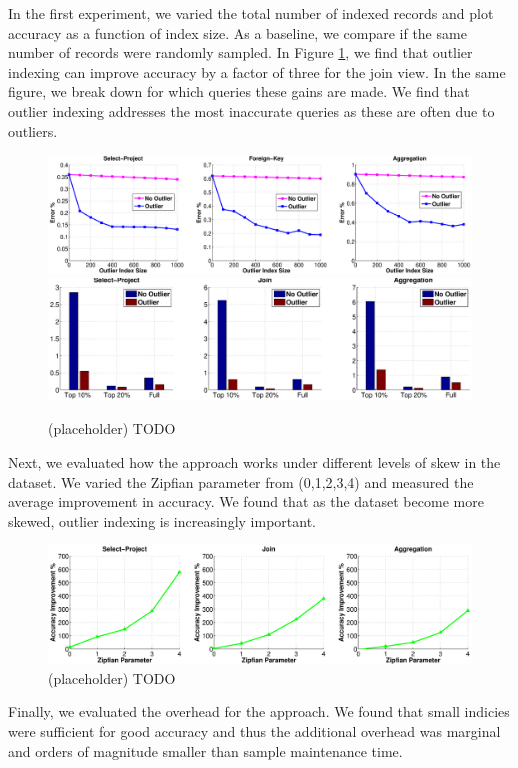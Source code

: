 In the first experiment, we varied the total number of indexed records and plot accuracy as a function of index size.
As a baseline, we compare if the same number of records were randomly sampled.
In Figure \ref{exp7outlier}, we find that outlier indexing can improve accuracy by a factor of three for the join view. 
In the same figure, we break down for which queries these gains are made. 
We find that outlier indexing addresses the most inaccurate queries as these are often due to outliers. 
\begin{figure}[ht!]
\label{exp7outlier}
\centering
\includegraphics[width=\textwidth]{exp/exp6-outlier.eps}
\includegraphics[width=\textwidth]{exp/exp7-outlier.eps}
 \caption{(placeholder) TODO}
\end{figure}

Next, we evaluated how the approach works under different levels of skew in the dataset. We varied the Zipfian parameter from (0,1,2,3,4) and measured the average improvement in accuracy. 
We found that as the dataset become more skewed, outlier indexing is increasingly important.
\begin{figure}[ht!]
\label{exp8outlier}
\centering
\includegraphics[width=\textwidth]{exp/exp8-outlier.eps}
 \caption{(placeholder) TODO}
\end{figure}

Finally, we evaluated the overhead for the approach. 
We found that small indicies were sufficient for good accuracy and thus the additional overhead was marginal and orders of magnitude smaller than sample maintenance time.

